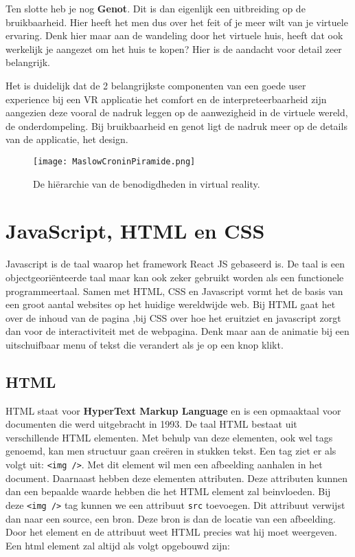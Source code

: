 Ten slotte heb je nog \textbf{Genot}. Dit is dan eigenlijk een uitbreiding op de bruikbaarheid. Hier heeft het men dus over het feit of je meer wilt van je virtuele ervaring. Denk hier maar aan de wandeling door het virtuele huis, heeft dat ook werkelijk je aangezet om het huis te kopen? Hier is de aandacht voor detail zeer belangrijk.

Het is duidelijk dat de 2 belangrijkste componenten van een goede user experience bij een VR applicatie het comfort en de interpreteerbaarheid zijn aangezien deze vooral de nadruk leggen op de aanwezigheid in de virtuele wereld, de onderdompeling. Bij bruikbaarheid en genot ligt de nadruk meer op de details van de applicatie, het design.

\begin{figure}
	\centering
	\texttt{[image: MaslowCroninPiramide.png]}
	\caption{De hiërarchie van de benodigdheden in virtual reality.}
	\label{fig:maslowcroninpiramide}
\end{figure}

\section{JavaScript, HTML en CSS}
\label{sec:frameworks}
Javascript is de taal waarop het framework React JS gebaseerd is. De taal is een objectgeoriënteerde taal maar kan ook zeker gebruikt worden als een functionele programmeertaal. Samen met HTML, CSS en Javascript vormt het de basis van een groot aantal websites op het huidige wereldwijde web. Bij HTML gaat het over de inhoud van de pagina ,bij CSS over hoe het eruitziet en javascript zorgt dan voor de interactiviteit met de webpagina. Denk maar aan de animatie bij een uitschuifbaar menu of tekst die verandert als je op een knop klikt.

\subsection{HTML}
HTML staat voor \textbf{HyperText Markup Language} en is een opmaaktaal voor documenten die werd uitgebracht in 1993. De taal HTML bestaat uit verschillende HTML elementen. Met behulp van deze elementen, ook wel tags genoemd, kan men structuur gaan creëren in stukken tekst. Een tag ziet er als volgt uit: \lstinline[basicstyle=\ttfamily\color{red}]|<img />|. Met dit element wil men een afbeelding aanhalen in het document. Daarnaast hebben deze elementen attributen. Deze attributen kunnen dan een bepaalde waarde hebben die het HTML element zal beinvloeden. Bij deze \lstinline[basicstyle=\ttfamily\color{red}]|<img />| tag kunnen we een attribuut \lstinline[basicstyle=\ttfamily\color{red}]|src| toevoegen. Dit attribuut verwijst dan naar een source, een bron. Deze bron is dan de locatie van een afbeelding. Door het element en de attribuut weet HTML precies wat hij moet weergeven. Een html element zal altijd als volgt opgebouwd zijn: 

